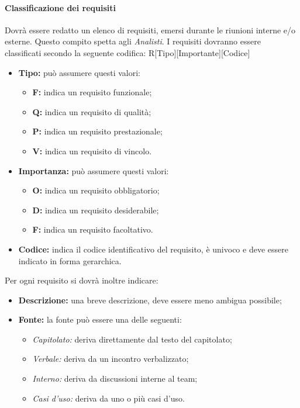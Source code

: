 \paragraph{Classificazione dei requisiti}
Dovrà essere redatto un elenco di requisiti, emersi durante le riunioni interne 
e/o esterne. Questo compito spetta agli \textsl{Analisti}. I requisiti dovranno 
essere classificati secondo la seguente codifica:
R[Tipo][Importante][Codice]

\begin{itemize} 
  \item \textbf{Tipo:} può assumere questi valori:
  \begin{itemize}
    \item \textbf{F:} indica un requisito funzionale;
    \item \textbf{Q:} indica un requisito di qualità;
    \item \textbf{P:} indica un requisito prestazionale;
    \item \textbf{V:} indica un requisito di vincolo.
  \end{itemize}
  \item \textbf{Importanza:} può assumere questi valori:
  \begin{itemize}
    \item \textbf{O:} indica un requisito obbligatorio;
    \item \textbf{D:} indica un requisito desiderabile;
    \item \textbf{F:} indica un requisito facoltativo.
  \end{itemize}
  \item \textbf{Codice:} indica il codice identificativo del requisito, è 
  univoco e deve essere indicato in forma gerarchica.
\end{itemize}
Per ogni requisito si dovrà inoltre indicare: 
\begin{itemize}
  \item \textbf{Descrizione:} una breve descrizione, deve essere meno ambigua possibile;
  \item \textbf{Fonte:} la fonte può essere una delle seguenti:
  \begin{itemize}
    \item \textsl{Capitolato:} deriva direttamente dal testo del capitolato;
    \item \textsl{Verbale:} deriva da un incontro verbalizzato;
    \item \textsl{Interno:} deriva da discussioni interne al team;
    \item \textsl{Casi d'uso:} deriva da uno o più casi d'uso.
  \end{itemize}
\end{itemize} 
